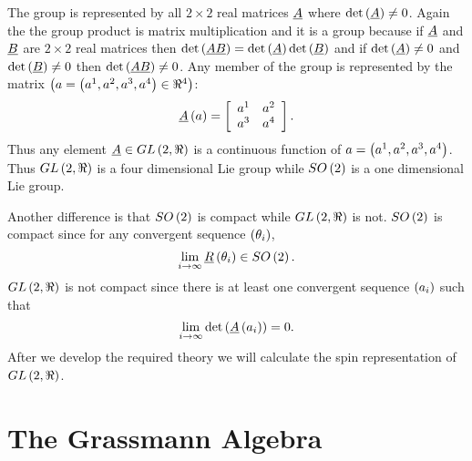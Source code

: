 The group is represented by all $2\times 2$ real matrices $\underline{A}$ where ${\det}\left ( {\underline{A}} \right ) \ne 0$.  Again the the group product is
matrix multiplication and it is a group because if $\underline{A}$ and $\underline{B}$ are $2\times 2$ real matrices then 
${\det}\left ( {\underline{A}\underline{B}} \right ) = {\det}\left ( {\underline{A}} \right ){\det}\left ( {\underline{B}} \right )$ and if ${\det}\left ( {\underline{A}} \right )\ne 0$ and ${\det}\left ( {\underline{B}} \right )\ne 0$ then ${\det}\left ( {\underline{A}\underline{B}} \right )\ne 0$.  Any member of 
the group is represented by the matrix $\left ( {a = \left ( {a^{1},a^{2},a^{3},a^{4}} \right )\in \Re^{4}} \right )$:
\begin{equation}
	{\underline{A}}\left ( {a} \right ) = \left [ {
	\begin{array}{cc}
		a^{1} & a^{2} \\
		a^{3} & a^{4}
	\end{array}
	}\right ].
\end{equation}
Thus any element $\underline{A}\in {GL}\left ( {2,\Re} \right )$ is a continuous function of $a = \left ( {a^{1},a^{2},a^{3},a^{4}} \right )$.  Thus ${GL}\left ( {2,\Re} \right )$ is a four
dimensional Lie group while ${SO}\left ( {2} \right )$ is a one dimensional Lie group.

Another difference is that  ${SO}\left ( {2} \right )$ is compact while ${GL}\left ( {2,\Re} \right )$ is not.  ${SO}\left ( {2} \right )$ is compact since for any
convergent sequence $\left ( {\theta_{i}} \right )$,
\begin{equation*}
	\lim_{i\rightarrow\infty}{\underline{R}}\left ( {\theta_{i}} \right )\in {SO}\left ( {2} \right ).
\end{equation*} 
${GL}\left ( {2,\Re} \right )$ is not compact since there is at least one convergent sequence $\left ( {a_{i}} \right )$ 
such that
\begin{equation*}
	\lim_{i\rightarrow\infty}{\det}\left ( {{\underline{A}}\left ( {a_{i}} \right )} \right ) = 0.
\end{equation*} 
After we develop the required theory we will calculate the spin representation of ${GL}\left ( {2,\Re} \right )$.

\section{The Grassmann Algebra}

